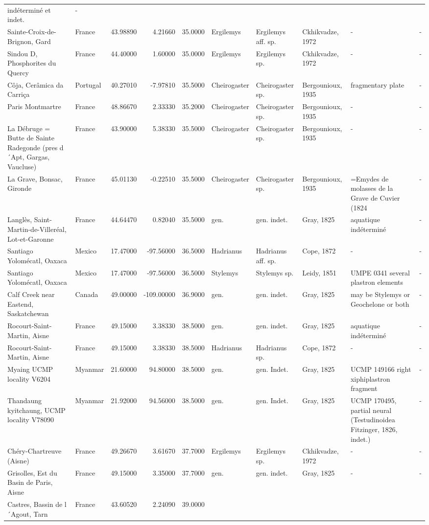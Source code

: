 \documentclass[]{article}
\begin{document}
\begin{longtable}[]{@{}llrrrlllll@{}}
indéterminé et indet. & -\tabularnewline
Sainte-Croix-de-Brignon, Gard & France & 43.98890 & 4.21660 & 35.0000 &
Ergilemys & Ergilemys aff. sp. & Ckhikvadze, 1972 & - & -\tabularnewline
Sindou D, Phosphorites du Quercy & France & 44.40000 & 1.60000 & 35.0000
& Ergilemys & Ergilemys sp. & Ckhikvadze, 1972 & - & -\tabularnewline
Côja, Cerâmica da Carriça & Portugal & 40.27010 & -7.97810 & 35.5000 &
Cheirogaster & Cheirogaster sp. & Bergounioux, 1935 & fragmentary plate
& -\tabularnewline
Paris Montmartre & France & 48.86670 & 2.33330 & 35.2000 & Cheirogaster
& Cheirogaster sp. & Bergounioux, 1935 & - & -\tabularnewline
La Débruge = Butte de Sainte Radegonde (pres d´Apt, Gargas, Vaucluse) &
France & 43.90000 & 5.38330 & 35.5000 & Cheirogaster & Cheirogaster sp.
& Bergounioux, 1935 & - & -\tabularnewline
La Grave, Bonsac, Gironde & France & 45.01130 & -0.22510 & 35.5000 &
Cheirogaster & Cheirogaster sp. & Bergounioux, 1935 & =Emydes de
molasses de la Grave de Cuvier (1824 & -\tabularnewline
Langlès, Saint-Martin-de-Villeréal, Lot-et-Garonne & France & 44.64470 &
0.82040 & 35.5000 & gen. & gen. indet. & Gray, 1825 & aquatique
indéterminé & -\tabularnewline
Santiago Yolomécatl, Oaxaca & Mexico & 17.47000 & -97.56000 & 36.5000 &
Hadrianus & Hadrianus aff. sp. & Cope, 1872 & - & -\tabularnewline
Santiago Yolomécatl, Oaxaca & Mexico & 17.47000 & -97.56000 & 36.5000 &
Stylemys & Stylemys sp. & Leidy, 1851 & UMPE 0341 several plastron
elements & -\tabularnewline
Calf Creek near Eastend, Saskatchewan & Canada & 49.00000 & -109.00000 &
36.9000 & gen. & gen. indet. & Gray, 1825 & may be Stylemys or
Geochelone or both & -\tabularnewline
Rocourt-Saint-Martin, Aisne & France & 49.15000 & 3.38330 & 38.5000 &
gen. & gen. indet. & Gray, 1825 & aquatique indéterminé &
-\tabularnewline
Rocourt-Saint-Martin, Aisne & France & 49.15000 & 3.38330 & 38.5000 &
Hadrianus & Hadrianus sp. & Cope, 1872 & - & -\tabularnewline
Myaing UCMP locality V6204 & Myanmar & 21.60000 & 94.80000 & 38.5000 &
gen. & gen. Indet. & Gray, 1825 & UCMP 149166 right xiphiplastron
fragment & -\tabularnewline
Thandaung kyitchaung, UCMP locality V78090 & Myanmar & 21.92000 &
94.56000 & 38.5000 & gen. & gen. Indet. & Gray, 1825 & UCMP 170495,
partial neural (Testudinoidea Fitzinger, 1826, indet.) &
-\tabularnewline
Chéry-Chartreuve (Aisne) & France & 49.26670 & 3.61670 & 37.7000 &
Ergilemys & Ergilemys sp. & Ckhikvadze, 1972 & - & -\tabularnewline
Grisolles, Est du Basin de Paris, Aisne & France & 49.15000 & 3.35000 &
37.7000 & gen. & gen. indet. & Gray, 1825 & - & -\tabularnewline
Castres, Bassin de l´Agout, Tarn & France & 43.60520 & 2.24090 & 39.0000

\end{longtable}
\end{document}
